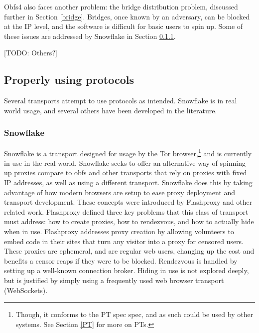 \documentclass[12pt]{report}
\begin{document}
Obfs4 also faces another problem: the bridge distribution problem, discussed further in Section \ref{bridge}. Bridges, once known by an adversary, can be blocked at the IP level, and the software is difficult for basic users to spin up. Some of these issues are addressed by Snowflake in Section \ref{snowflake}.

[TODO: Others?]

\subsection{Properly using protocols}

Several transports attempt to use protocols as intended. Snowflake is in real world usage, and several others have been developed in the literature.

\subsubsection{Snowflake}
\label{snowflake}

Snowflake is a transport designed for usage by the Tor browser,\footnote{Though, it conforms to the PT spec spec, and as such could be used by other systems. See Section \ref{PT} for more on PTs.} and is currently in use in the real world. Snowflake seeks to offer an alternative way of spinning up proxies compare to obfs and other transports that rely on proxies with fixed IP addresses, as well as using a different transport. Snowflake does this by taking advantage of how modern browsers are setup to ease proxy deployment and transport development. These concepts were introduced by Flashproxy and other related work. Flashproxy defined three key problems that this class of transport must address: how to create proxies, how to rendezvous, and how to actually hide when in use.\cite{flashproxy} Flashproxy addresses proxy creation by allowing volunteers to embed code in their sites that turn any visitor into a proxy for censored users. These proxies are ephemeral, and are regular web users, changing up the cost and benefits a censor reaps if they were to be blocked. Rendezvous is handled by setting up a well-known connection broker. Hiding in use is not explored deeply, but is justified by simply using a frequently used web browser transport (WebSockets).
\end{document}
